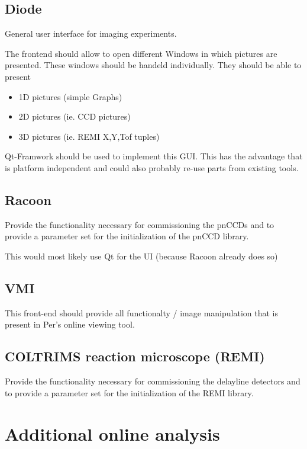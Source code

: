 \documentclass[11pt,a4paper,oneside]{article}
\begin{document}
\subsection{Diode}
\label{sec:diode}

General user interface for imaging experiments.

The frontend should allow to open different Windows in which pictures are presented. These windows should be handeld individually. They should be able to present 
\begin{itemize}
	\item 1D pictures (simple Graphs)
	\item 2D pictures (ie. CCD pictures)
	\item 3D pictures (ie. REMI X,Y,Tof tuples)
\end{itemize}

Qt-Framwork should be used to implement this GUI. This has the advantage that is platform independent and could also probably re-use parts from existing tools.

\subsection{Racoon}
\label{sec:racoon}

Provide the functionality necessary for commissioning the pnCCDs and to provide a parameter set for the initialization of the pnCCD library.

This would most likely use Qt for the UI (because Racoon already does so)


\subsection{VMI}
\label{sec:vmi-frontend}

This front-end should provide all functionalty / image manipulation that is present in Per's online viewing tool.

\subsection{COLTRIMS reaction microscope (REMI)}
\label{sec:remi-frontend}

Provide the functionality necessary for commissioning the delayline detectors and to provide a parameter set for the initialization of the REMI library.


\section{Additional online analysis}
\label{sec:additional_online_analysis}
\end{document}
